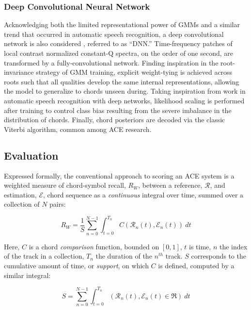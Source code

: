 \documentclass{article}
\begin{document}
\subsubsection{Deep Convolutional Neural Network}

Acknowledging both the limited representational power of GMMs and a similar trend that occurred in automatic speech recognition, a deep convolutional network is also considered \cite{Humphrey2015Fully}, referred to as ``DNN.''
Time-frequency patches of local contrast normalized constant-Q spectra, on the order of one second, are transformed by a fully-convolutional network.
Finding inspiration in the root-invariance strategy of GMM training, explicit weight-tying is achieved across roots such that all qualities develop the same internal representations, allowing the model to generalize to chords unseen during.
Taking inspiration from work in automatic speech recognition with deep networks, likelihood scaling is performed after training to control class bias resulting from the severe imbalance in the distribution of chords.
Finally, chord posteriors are decoded via the classic Viterbi algorithm, common among ACE research.


\subsection{Evaluation}

Expressed formally, the conventional approach to scoring an ACE system is a weighted measure of chord-symbol recall, $R_{W}$, between a reference, $\mathcal{R}$, and estimation, $\mathcal{E}$, chord sequence as a \emph{continuous} integral over time, summed over a collection of $N$ pairs:

\begin{equation}
\label{eq:recall_micro}
R_{W} = \frac{1}{S}\sum_{n=0}^{N-1}\int_{t=0}^{T_n}C(\mathcal{R}_n(t), \mathcal{E}_n(t))~dt
\end{equation}

\noindent Here, $C$ is a chord \emph{comparison} function, bounded on $[0, 1]$, $t$ is time, $n$ the index of the track in a collection, $T_n$ the duration of the $n^{th}$ track. $S$ corresponds to the cumulative amount of time, or \emph{support}, on which $C$ is defined, computed by a similar integral:

\begin{equation}
S = \sum_{n=0}^{N-1}\int_{t=0}^{T_n}(\mathcal{R}_n(t), \mathcal{E}_n(t) \in \Re)~dt
\end{equation}
\end{document}
